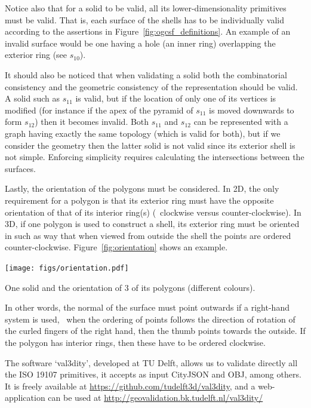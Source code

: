 Notice also that for a solid to be valid, all its lower-dimensionality primitives must be valid.
That is, each surface of the shells has to be individually valid according to the assertions in Figure~\ref{fig:ogcsf_definitions}.
An example of an invalid surface would be one having a hole (an inner ring) overlapping the exterior ring (see $s_{10}$).

It should also be noticed that when validating a solid both the combinatorial consistency and the geometric consistency of the representation should be valid.
A solid such as $s_{11}$ is valid, but if the location of only one of its vertices is modified (for instance if the apex of the pyramid of $s_{11}$ is moved downwards to form $s_{12}$) then it becomes invalid. 
Both $s_{11}$ and $s_{12}$ can be represented with a graph having exactly the same topology (which is valid for both), but if we consider the geometry then the latter solid is not valid since its exterior shell is not simple.
Enforcing simplicity requires calculating the intersections between the surfaces.

Lastly, the orientation of the polygons must be considered.
In 2D, the only requirement for a polygon is that its exterior ring must have the opposite orientation of that of its interior ring(s) (\eg\ clockwise versus counter-clockwise).
In 3D, if one polygon is used to construct a shell, its exterior ring must be oriented in such as way that when viewed from outside the shell the points are ordered counter-clockwise.
Figure~\ref{fig:orientation} shows an example.
\begin{marginfigure}
  \centering
  \texttt{[image: figs/orientation.pdf]}
  \caption{One solid and the orientation of 3 of its polygons (different colours).}%
\label{fig:orientation}
\end{marginfigure}
In other words, the normal of the surface must point outwards if a right-hand system is used, \ie\ when the ordering of points follows the direction of rotation of the curled fingers of the right hand, then the thumb points towards the outside.
If the polygon has interior rings, then these have to be ordered clockwise.


\begin{kaobox}[frametitle=\faCog\ How does it work in practice?]
  The software `val3dity', developed at TU Delft, allows us to validate directly all the ISO 19107 primitives, it accepts as input CityJSON and OBJ, among others.
  It is freely available at \url{https://github.com/tudelft3d/val3dity}, and a web-application can be used at \url{http://geovalidation.bk.tudelft.nl/val3dity/}
\end{kaobox}

